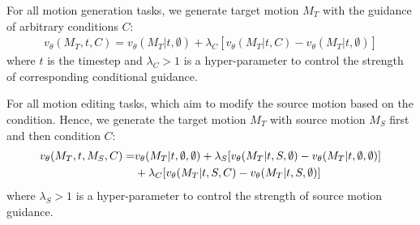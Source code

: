 For all motion generation tasks, we generate target motion $M_T$ with the guidance of arbitrary conditions $C$:
\begin{align}
v_\theta(M_T,t,C) = v_\theta(M_T|t,\emptyset)+\lambda_C[v_\theta(M_T|t,C)-v_\theta(M_T|t,\emptyset)]
\end{align}
where $t$ is the timestep and $\lambda_C>1$ is a hyper-parameter to control the strength of corresponding conditional guidance.

For all motion editing tasks, which aim to modify the source motion based on the condition. Hence, we generate the target motion $M_T$ with source motion $M_S$ first and then condition $C$:
\begin{align}
\notag
v_\theta(M_T,t,M_S,C) = & v_\theta(M_T|t,\emptyset,\emptyset) +\lambda_S[v_\theta(M_T|t,S,\emptyset)-v_\theta(M_T|t,\emptyset,\emptyset)] \nonumber \\ 
&+\lambda_C[v_\theta(M_T|t,S,C)-v_\theta(M_T|t,S,\emptyset)]
\end{align}
where $\lambda_S>1$ is a hyper-parameter to control the strength of source motion guidance.

